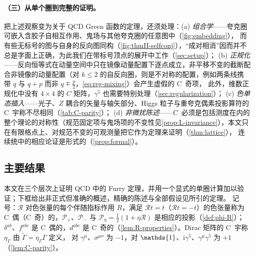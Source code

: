 \documentclass[UTF8,a4paper,11pt,fontset=fandol]{ctexart}
\let\amsmathbb\mathbb
\renewcommand{\mathbb}[1]{\ifx1#1\mathds{1}\else\amsmathbb{#1}\fi}
\theoremstyle{cplain}
\theoremstyle{cdefinition}
\theoremstyle{cremark}
\numberwithin{equation}{section}
\newcommand{\Rop}{\mathcal{R}}                       %
\newcommand{\Pp}{\mathcal{P}_{+}}                    %
\newcommand{\Pm}{\mathcal{P}_{-}}                    %
\newcommand{\ii}{\mathrm{i}}                        %
\newcommand{\Cconj}[1]{\widetilde{#1}}              %
\begin{document}
\paragraph{（三）从单个圈到完整的证明。}
把上述观察变为关于 QCD Green 函数的定理，还须处理：(a) \emph{组合学}——夸克圈可嵌入含胶子自相互作用、鬼场与其他夸克圈的任意图中（\cref{fig:embedding}），
而有些无标号的图与自身的反向图同构（\cref{fig:thmII-selfconj}），“成对相消”因而并不总是字面上正确，为此我们在带标号顶点的展开中工作（\cref{sec:setup}）；
(b) \emph{正规化}——反向恒等式在动量空间中只在镜像动量配置下逐点成立，非平移不变的截断配合非镜像的动量配置（对 $k\le2$ 的自反向圈，则是不对称的配置，例如两条线携带 $q$ 与 $q+p$ 而非 $q\mp\frac p2$，\cref{eq:reg-mixing}）会产生虚假的 C~奇项，
此外，维数正规化中没有 $4\times4$ 的 $C$ 矩阵，$\gamma^5$ 也需要特别处理（\cref{sec:regularization}）；
(c) \emph{色单态插入}——光子、$Z$ 耦合的矢量与轴矢部分、Higgs 粒子与重夸克偶素投影算符的 C~宇称不尽相同（\cref{tab:C-parity}）；
(d) \emph{非微扰陈述}——C~必须是包括测度在内的整个理论的对称性（规范固定项与鬼场项的不变性见\cref{prop:L-invariance}），本文只在有限格点上、对规范不变的可观测量把它作为定理来证明（\cref{thm:lattice}），
连续统中的相应论证是形式的（\cref{prop:formal}）。

\subsection{主要结果}\label{sec:intro-results}

本文在三个层次上证明 QCD 中的 Furry 定理，并用一个显式的单圈计算加以验证；下框给出非正式但准确的概述，精确的陈述与全部假设见所引的定理。
记号：$\Rop$ 对色张量的每个伴随指标作用 $R$，满足 $\Rop t=t$（$\Rop t=-t$）的色张量称为 C~偶（C~奇）的，$\Pp$、$\Pm$ 与 $\mathcal P_\eta=\frac12(1+\eta\Rop)$ 是相应的投影（\cref{def:phi-R}）；
$\delta^{ab}$、$f^{abc}$ 是 C~偶的，$d^{abc}$ 是 C~奇的（\cref{lem:R-properties}）。Dirac 矩阵的 C~宇称 $\eta_\Gamma$ 由 $\Cconj\Gamma=\eta_\Gamma\Gamma$ 定义，
对 $\gamma^\mu$、$\sigma^{\mu\nu}$ 为 $-1$，对 $\mathbb 1$、$\ii\gamma^5$、$\gamma^\mu\gamma^5$ 为 $+1$（\cref{lem:C-parity}）。
\end{document}
